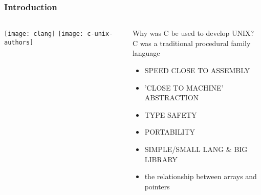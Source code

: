 \begin{frame}[plain]
	\frametitle{Introduction}
	
	
	
	\begin{columns}
		
		\begin{column}{.3\textwidth}
			
			\texttt{[image: clang]}
			\texttt{[image: c-unix-authors]}
		\end{column}
		
		\begin{column}{.7\textwidth}
			
			\Large
			Why was C be used to develop UNIX? \\
			C was a traditional procedural family language
			\normalsize
			\begin{itemize}
				\item  SPEED CLOSE TO ASSEMBLY
				\item  'CLOSE TO MACHINE' ABSTRACTION
				\item  TYPE SAFETY
				\item  PORTABILITY
				\item  SIMPLE/SMALL LANG \& BIG LIBRARY
				\item  the relationship between arrays and pointers
			\end{itemize}
			
		\end{column}
		
		
	\end{columns}
	
	
\end{frame}

